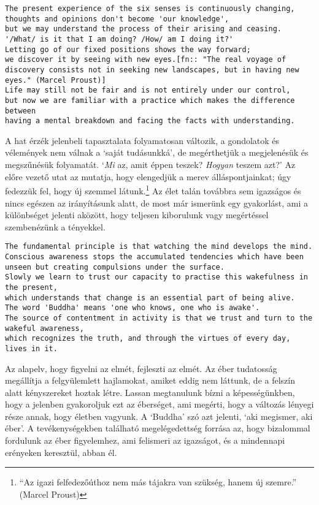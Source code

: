 \begin{verbatim}
The present experience of the six senses is continuously changing,
thoughts and opinions don't become 'our knowledge',
but we may understand the process of their arising and ceasing.
'/What/ is it that I am doing? /How/ am I doing it?'
Letting go of our fixed positions shows the way forward;
we discover it by seeing with new eyes.[fn:: "The real voyage of discovery consists not in seeking new landscapes, but in having new eyes." (Marcel Proust)]
Life may still not be fair and is not entirely under our control,
but now we are familiar with a practice which makes the difference between
having a mental breakdown and facing the facts with understanding.
\end{verbatim}

A hat érzék jelenbeli tapasztalata folyamatosan változik, a gondolatok
és vélemények nem válnak a `saját tudásunkká', de megérthetjük a
megjelenésük és megszűnésük folyamatát. `\emph{Mi} az, amit éppen
teszek? \emph{Hogyan} teszem azt?' Az előre vezető utat az mutatja, hogy
elengedjük a merev álláspontjainkat; úgy fedezzük fel, hogy új szemmel
látunk.\footnote{``Az igazi felfedezőúthoz nem más tájakra van szükség,
  hanem új szemre.'' (Marcel Proust)} Az élet talán továbbra sem
igazságos és nincs egészen az irányításunk alatt, de most már ismerünk
egy gyakorlást, ami a különbséget jelenti aközött, hogy teljesen
kiborulunk vagy megértéssel szembenézünk a tényekkel.

\begin{verbatim}
The fundamental principle is that watching the mind develops the mind.
Conscious awareness stops the accumulated tendencies which have been unseen but creating compulsions under the surface.
Slowly we learn to trust our capacity to practise this wakefulness in the present,
which understands that change is an essential part of being alive.
The word 'Buddha' means 'one who knows, one who is awake'.
The source of contentment in activity is that we trust and turn to the wakeful awareness,
which recognizes the truth, and through the virtues of every day, lives in it.
\end{verbatim}

Az alapelv, hogy figyelni az elmét, fejleszti az elmét. Az éber
tudatosság megállítja a felgyülemlett hajlamokat, amiket eddig nem
láttunk, de a felszín alatt kényszereket hoztak létre. Lassan
megtanulunk bízni a képességünkben, hogy a jelenben gyakoroljuk ezt az
éberséget, ami megérti, hogy a változás lényegi része annak, hogy
életben vagyunk. A `Buddha' szó azt jelenti, `aki megismer, aki éber'. A
tevékenységekben található megelégedettség forrása az, hogy bizalommal
fordulunk az éber figyelemhez, ami felismeri az igazságot, és a
mindennapi erényeken keresztül, abban él.
